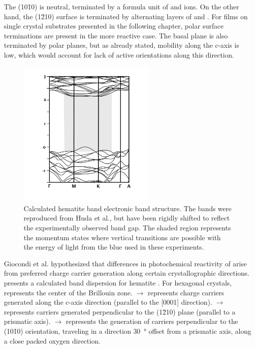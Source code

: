The (10\={1}0) is neutral, terminated by a formula unit of  and 
ions. On the other hand, the (1\={2}10) surface is terminated by alternating layers of
 and . For  films on single crystal substrates presented
in the following chapter, polar surface terminations are present in the more reactive
case. The basal plane is also terminated by polar planes, but as already stated, mobility
along the c-axis is low, which would account for lack of active orientations along this
direction.

\begin{figure}
    \begin{center}
    \includegraphics[width=0.6\textwidth]{fe2o3dispersion.pdf}
    \caption[Calculated hematite band electronic band structure]{%
        Calculated hematite band electronic band structure. The bands were reproduced from
        Huda et al.,\cite{Huda:2010kx} but have been rigidly shifted to reflect the experimentally
        observed band gap. The shaded region represents the momentum states where vertical
        transitions are possible with the energy of light from the blue  used in these
        experiments.}
    \label{fig:fe2o3dispersion}
    \end{center}
\end{figure}
Giocondi et al.\cite{Giocondi:2007fa} hypothesized that differences in photochemical
reactivity of  arise from preferred charge carrier generation along certain
crystallographic directions.  presents a calculated band
dispersion for hematite . For hexagonal crystals, {\textGamma} represents the
center of the Brillouin zone. \textGamma$\rightarrow${\textAlpha} represents charge
carriers generated along the c-axis direction (parallel to the [0001] direction).
\textGamma$\rightarrow${\textMu} represents carriers generated perpendicular to the
(1\={2}10) plane (parallel to a prismatic axis). \textGamma$\rightarrow${\textKappa}
represents the generation of carriers perpendicular to the (10\={1}0) orientation,
traveling in a direction \SI{30}{\degree} offset from a prismatic axis, along a close
packed oxygen direction.

